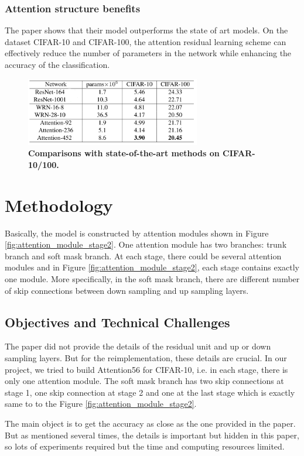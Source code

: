 \documentclass{article}
\newcommand{\mycaption}[2]{\caption[#1]{\textbf{#1.} #2}}
\begin{document}
\begin{multicols}{2}
\subsubsection{Attention structure benefits}
The paper shows that their model outperforms the state of art models. On the dataset CIFAR-10 and CIFAR-100, the attention residual learning scheme can effectively reduce the number of parameters in the network while enhancing the accuracy of the classification.
\begin{figure}[H] 
\includegraphics[width=3in]{imgs/cifar10_modes}  
\mycaption{Comparisons with state-of-the-art methods on CIFAR-10/100}{}
\label{fig:cifar10_modes}
\end{figure}





\section{Methodology}
Basically, the model is constructed by attention modules shown in Figure \ref{fig:attention_module_stage2}. One attention module has two branches: trunk branch and soft mask branch. At each stage, there could be several attention modules and in Figure \ref{fig:attention_module_stage2}, each stage contains exactly one module. More specifically, in the soft mask branch, there are different number of skip connections between down sampling and up sampling layers. 
 
\subsection{Objectives and Technical Challenges}
The paper did not provide the details of the residual unit and up or down sampling layers. But for the reimplementation, these details are crucial. In our project, we tried to build Attention56 for CIFAR-10, i.e. in each stage, there is only one attention module. The soft mask branch has two skip connections at stage 1, one skip connection at stage 2 and one at the last stage which is exactly same to to the Figure \ref{fig:attention_module_stage2}. 

The main object is to get the accuracy as close as the one provided in the paper. But as mentioned several times, the details is important but hidden in this paper, so lots of experiments required but the time and computing resources limited. 


\end{multicols}
\end{document}
